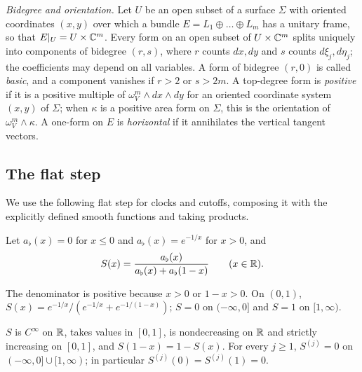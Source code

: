 \emph{Bidegree and orientation.} Let $U$ be an open subset of a surface $\Sigma$ with oriented coordinates
$(x,y)$ over which a bundle $E=L_1\oplus\dots\oplus L_m$ has a unitary frame, so that $E|_U=U\times\mathbb{C}^m$. Every
form on an open subset of $U\times\mathbb{C}^m$ splits uniquely into components of bidegree $(r,s)$, where $r$
counts $dx,dy$ and $s$ counts $d\xi_j,d\eta_j$; the coefficients may depend on all variables. A form of
bidegree $(r,0)$ is called \emph{basic}, and a component vanishes if $r>2$ or $s>2m$. A top-degree form is
\emph{positive} if it is a positive multiple of $\omega_V^m\wedge dx\wedge dy$ for an oriented coordinate system
$(x,y)$ of $\Sigma$; when $\kappa$ is a positive area form on $\Sigma$, this is the orientation of
$\omega_V^m\wedge\kappa$. A one-form on $E$ is \emph{horizontal} if it annihilates the vertical tangent vectors.

\subsection{The flat step}\label{sec:pre-flat}

We use the following flat step for clocks and cutoffs, composing it with the explicitly defined
smooth functions and taking products.

\begin{definition}\label{def:pre-flat}
Let $a_\flat(x)=0$ for $x\le0$ and $a_\flat(x)=e^{-1/x}$ for $x>0$, and
\[
 S(x)=\frac{a_\flat(x)}{a_\flat(x)+a_\flat(1-x)}\qquad(x\in\mathbb{R}).
\]
\end{definition}

The denominator is positive because $x>0$ or $1-x>0$. On $(0,1)$,
$S(x)=e^{-1/x}/(e^{-1/x}+e^{-1/(1-x)})$; $S=0$ on $(-\infty,0]$ and $S=1$ on $[1,\infty)$.

\begin{lemma}[Properties of $S$]\label{lem:pre-flat}
$S$ is $C^\infty$ on $\mathbb{R}$, takes values in $[0,1]$, is nondecreasing on $\mathbb{R}$ and strictly increasing on
$[0,1]$, and $S(1-x)=1-S(x)$. For every $j\ge1$, $S^{(j)}=0$ on $(-\infty,0]\cup[1,\infty)$; in particular
$S^{(j)}(0)=S^{(j)}(1)=0$.
\end{lemma}

